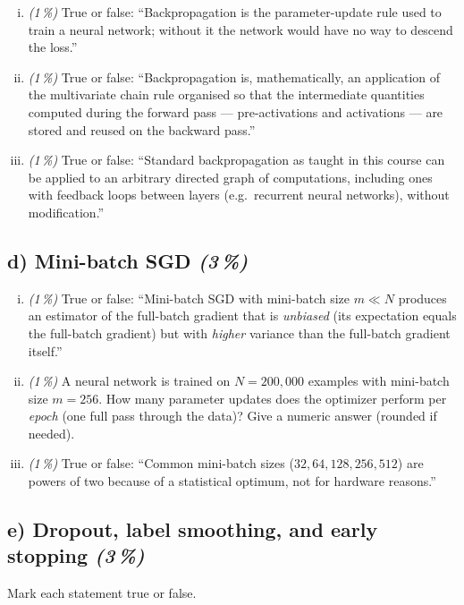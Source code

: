\documentclass[11pt,a4paper]{article}
\newcommand{\subpoints}[1]{\textit{(#1\,\%)}}
\begin{document}
\begin{enumerate}[(i)]
  \item \subpoints{1} True or false: ``Backpropagation is the parameter-update rule used to train a neural network; without it the network would have no way to descend the loss.''
  \item \subpoints{1} True or false: ``Backpropagation is, mathematically, an application of the multivariate chain rule organised so that the intermediate quantities computed during the forward pass --- pre-activations and activations --- are stored and reused on the backward pass.''
  \item \subpoints{1} True or false: ``Standard backpropagation as taught in this course can be applied to an arbitrary directed graph of computations, including ones with feedback loops between layers (e.g.\ recurrent neural networks), without modification.''
\end{enumerate}

\subsection*{d) Mini-batch SGD \subpoints{3}}

\begin{enumerate}[(i)]
  \item \subpoints{1} True or false: ``Mini-batch SGD with mini-batch size $m \ll N$ produces an estimator of the full-batch gradient that is \emph{unbiased} (its expectation equals the full-batch gradient) but with \emph{higher} variance than the full-batch gradient itself.''
  \item \subpoints{1} A neural network is trained on $N = 200{,}000$ examples with mini-batch size $m = 256$. How many parameter updates does the optimizer perform per \emph{epoch} (one full pass through the data)? Give a numeric answer (rounded if needed).
  \item \subpoints{1} True or false: ``Common mini-batch sizes ($32, 64, 128, 256, 512$) are powers of two because of a statistical optimum, not for hardware reasons.''
\end{enumerate}

\subsection*{e) Dropout, label smoothing, and early stopping \subpoints{3}}

Mark each statement true or false.
\end{document}

